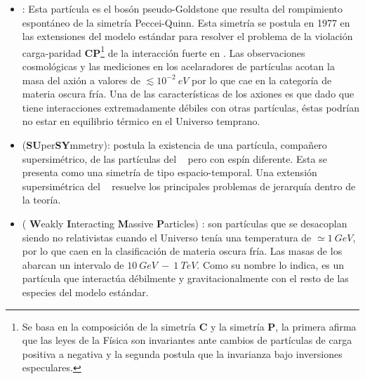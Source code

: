 \begin{itemize}
\item \textbf{\Axiones}%
: Esta partícula es el bosón pseudo-Goldstone que resulta del rompimiento espontáneo de la simetría Peccei-Quinn. Esta simetría se postula en 1977 en las extensiones del modelo estándar para resolver el problema de la violación carga-paridad \textbf{CP}\footnote{Se basa en la composición de la simetría \textbf{C} y la simetría \textbf{P}, la primera afirma que las leyes de la Física son invariantes  ante cambios de partículas de carga positiva a negativa y la segunda postula que la invarianza bajo inversiones especulares. } de la interacción fuerte en \QCD. Las observaciones cosmológicas y las mediciones en los acelaradores de partículas acotan la masa del axión a valores de $\lesssim 10^{-2}~eV$ por lo que cae en la categoría de materia oscura fría. Una de las características de los axiones es que dado que tiene interacciones extremadamente débiles con otras partículas, éstas podrían no estar en equilibrio térmico en el Universo temprano. 

\item  \SUSY (\textbf{SU}per\textbf{SY}mmetry): postula la existencia de una partícula, compañero supersimétrico, de las partículas del \ME ~ pero con espín diferente. Esta se presenta como una simetría de tipo espacio-temporal. Una extensión supersimétrica del \ME ~ resuelve los principales problemas de jerarquía dentro de la teoría.

\item \WIMPs ( \textbf{W}eakly \textbf{I}nteracting \textbf{M}assive \textbf{P}articles) %
: son partículas que se desacoplan siendo no relativistas cuando el Universo tenía una temperatura de $\simeq 1~ GeV$, por lo que caen en la clasificación de materia oscura fría. Las masas
de los \WIMPs ~ abarcan un intervalo de $10 ~ GeV ~ - ~ 1 ~ TeV$. Como su nombre lo indica, es un partícula que interactúa débilmente y gravitacionalmente con el resto de las especies del modelo estándar. 




\end{itemize}
